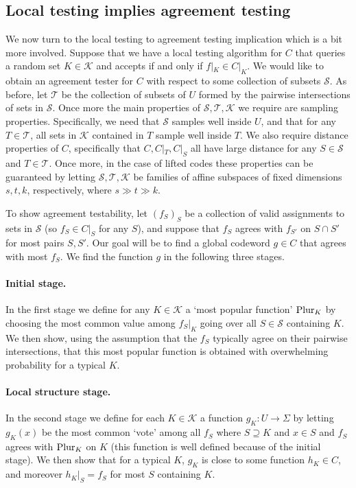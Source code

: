 \documentclass{toc}
\theoremstyle{plain}
\newcommand{\calT}{{\mathcal{T}}}
\newcommand{\calS}{{\mathcal{S}}}
\newcommand{\calK}{{\mathcal{K}}}
\newcommand{\pl}{{\rm{Plur}}}
\begin{document}
\subsection{Local testing implies agreement testing}

We now turn to the local testing to agreement testing implication which is a bit more involved. Suppose that we have a local testing algorithm for $C$ that queries a random set $K\in \calK$ and accepts if and only if $f|_K \in C|_K$. We would like to obtain an agreement tester for $C$ with respect to some collection of subsets $\calS$.
As before, let $\calT$ be the collection of subsets of $U$ formed by 
the  %
%
pairwise intersections of sets in $\calS$.
Once more the main properties 
%
of $\calS, \calT, \calK$
we require  %
are sampling properties. Specifically, we need  that $\calS$ samples well inside $U$, and that for any $T \in \calT$, all sets in $\calK$ contained in $T$ sample well inside $T$.
We also require distance properties %
of $C$, specifically that 
$C, C|_T, C|_S$ all have large distance %
for any $S \in \calS$ and $T \in \calT$.
 Once more, in the case of lifted codes these properties can be guaranteed by letting $\calS, \calT, \calK$ be families of affine subspaces of fixed dimensions $s,t,k$, respectively, where $s \gg t \gg k$.

To show agreement testability, let  $(f_S)_S$ be a collection of valid assignments to sets in $\calS$ (so  $f_S \in C|_S$ for any $S$), and suppose that $f_S$ agrees with $f_{S'}$ on $S\cap S'$ for most pairs $S,S'$. Our goal will be to find a global codeword $g \in C$ that agrees with most $f_S$.
We find the function $g$ in the following three stages.

\paragraph{Initial stage.} In the first stage we define for any $K \in \calK$ a `most popular function' %
$\pl_K$ by choosing the most common value among $f_S|_K$ going over all $S \in \calS$ containing $K$. We then show, using the assumption
that %
the $f_S$  %
typically agree on their
pairwise  %
intersections, that this most popular function is obtained with 
overwhelming probability for a typical $K$.
%
%

\paragraph{Local structure stage.} In the second stage we define for each $K \in \calK$ a function $g_K: U \to \Sigma$ by letting $g_K(x)$ be the most common `vote' among all $f_S$
%
where $S\supseteq K$ and $x\in S$  %
and %
$f_S$ agrees  %
with $\pl_K$  on $K$ (this function is well defined because of the initial stage). We then show that for a typical $K$, $g_K$ is close to some function $h_K \in C$, and moreover $h_K|_S = f_S$ for most $S$ containing $K$.
\end{document}
